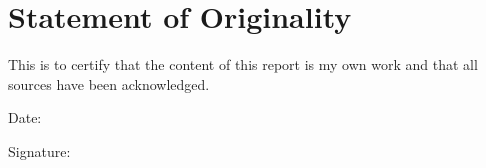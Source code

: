 \documentclass[a4paper, 11pt, listof=totoc, bibliography=totoc]{scrartcl}
\begin{document}
\newpage

\thispagestyle{empty}
\hfill

\newpage

\thispagestyle{empty}
\footnotesize
\tableofcontents
\normalsize

\newpage

\section*{Statement of Originality}

This is to certify that the content of this report is my own work and that all sources have been acknowledged.


Date:


Signature: 
\newpage
\hfill
\newpage







\newpage

\printbibliography
\end{document}
